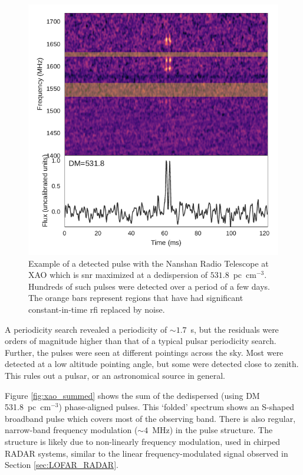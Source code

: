 \documentclass[a4paper,fleqn,usenatbib]{mnras}
\begin{document}
\begin{figure}
    \includegraphics[width=1.0\linewidth]{figures/XAO_pulse_dynamic.pdf}
    \caption{Example of a detected pulse with the Nanshan Radio Telescope at XAO
    which is \gls{snr} maximized at a dedispersion of $531.8$~pc~cm$^{-3}$.
    Hundreds of such pulses were detected over a period of a few days. The
    orange bars represent regions that have had significant constant-in-time
    \gls{rfi} replaced by noise.
    }
    \label{fig:xao_dynamic}
\end{figure}

A periodicity search revealed a periodicity of $\sim 1.7$~s, but the residuals
were orders of magnitude higher than that of a typical pulsar periodicity
search.  Further, the pulses were seen at different pointings across the sky.
Most were detected at a low altitude pointing angle, but some were detected
close to zenith.  This rules out a pulsar, or an astronomical source in general.

Figure \ref{fig:xao_summed} shows the sum of the dedispersed (using DM
531.8~pc~cm$^{-3}$) phase-aligned pulses.  This `folded' spectrum shows an
S-shaped broadband pulse which covers most of the observing band. There is also
regular, narrow-band frequency modulation ($\sim4$~MHz) in the pulse structure.
The structure is likely due to non-linearly frequency modulation, used in
chirped RADAR systems, similar to the linear frequency-modulated signal observed
in Section \ref{sec:LOFAR_RADAR}.
\end{document}
